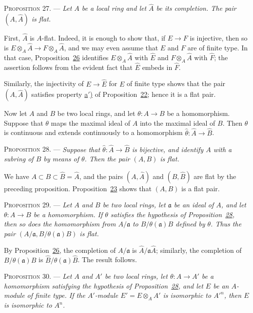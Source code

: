 \textsc{Proposition 27}. --- \emph{Let $A$ be a
local ring and let $\widehat{A}$ be its completion. The pair
$(A,\widehat{A})$ is flat.}

First, $\widehat{A}$ is $A$-flat. Indeed, it is enough to show that, if
$E\to F$ is injective, then so is
$E\otimes_A\widehat{A}\to F\otimes_A\widehat{A}$, and we may even assume
that $E$ and $F$ are of finite type. In that case,
Proposition~\hyperref[gaga:prop:26]{26} identifies
$E\otimes_A\widehat{A}$ with $\widehat{E}$ and
$F\otimes_A\widehat{A}$ with $\widehat{F}$; the assertion follows from the
evident fact that $\widehat{E}$ embeds in $\widehat{F}$.

Similarly, the injectivity of $E\to\widehat{E}$ for $E$ of finite type shows
that the pair $(A,\widehat{A})$ satisfies property
\hyperref[gaga:prop:22:item:a]{a$'$)} of
Proposition~\hyperref[gaga:prop:22]{22}; hence it is a flat pair.

Now let $A$ and $B$ be two local rings, and let $\theta:A\to B$ be a
homomorphism. Suppose that $\theta$ maps the maximal ideal of $A$ into the
maximal ideal of $B$. Then $\theta$ is continuous and extends continuously to
a homomorphism $\widehat{\theta}:\widehat{A}\to\widehat{B}$.

\textsc{Proposition 28}. --- \emph{Suppose that
$\widehat{\theta}:\widehat{A}\to\widehat{B}$ is bijective, and identify $A$
with a subring of $B$ by means of $\theta$. Then the pair $(A,B)$ is flat.}

We have $A\subset B\subset\widehat{B}=\widehat{A}$, and the pairs
$(A,\widehat{A})$ and $(B,\widehat{B})$ are flat by the preceding proposition.
Proposition~\hyperref[gaga:prop:23]{23} shows that $(A,B)$ is a flat pair.

\textsc{Proposition 29}. --- \emph{Let $A$ and $B$
be two local rings, let $\mathfrak{a}$ be an ideal of $A$, and let
$\theta:A\to B$ be a homomorphism. If $\theta$ satisfies the hypothesis of
Proposition~\hyperref[gaga:prop:28]{28}, then so does the homomorphism from
$A/\mathfrak{a}$ to $B/\theta(\mathfrak{a})B$ defined by $\theta$. Thus the
pair $(A/\mathfrak{a},B/\theta(\mathfrak{a})B)$ is flat.}

By Proposition~\hyperref[gaga:prop:26]{26}, the completion of
$A/\mathfrak{a}$ is $\widehat{A}/\mathfrak{a}\widehat{A}$; similarly, the
completion of $B/\theta(\mathfrak{a})B$ is
$\widehat{B}/\theta(\mathfrak{a})\widehat{B}$. The result follows.

\textsc{Proposition 30}. --- \emph{Let $A$ and $A'$
be two local rings, let $\theta:A\to A'$ be a homomorphism satisfying the
hypothesis of Proposition~\hyperref[gaga:prop:28]{28}, and let $E$ be an
$A$-module of finite type. If the $A'$-module
$E'=E\otimes_AA'$ is isomorphic to ${A'}^n$, then $E$ is isomorphic to
$A^n$.}

